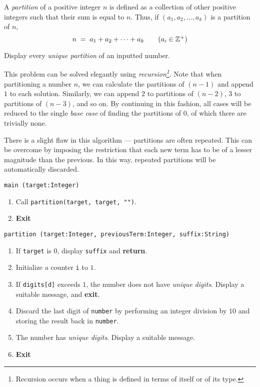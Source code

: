 

\problem A {\em partition} of a positive integer $n$ is defined as a collection of other positive integers such that
their sum is equal to $n$. Thus, if $(a_1, a_2, \dots, a_k)$ is a partition of $n$,
\begin{equation*}
	n	\;=\;	a_1 + a_2 + \dots + a_k 			\tag{$a_i \in \mathbb{Z}^{+}$}
\end{equation*}

Display every {\em unique partition} of an inputted number.

\solution This problem can be solved elegantly using {\em recursion\footnote{Recursion occurs when a thing is defined in terms of itself or of its type.}}. Note that when partitioning a number $n$, we can calculate the partitions of $(n - 1)$ and append $1$ to each solution. Similarly, we can append $2$ to partitions of $(n - 2)$, $3$ to partitions of $(n - 3)$, and so on. By continuing in this fashion, all cases will be reduced to the single {\em base case} of finding the partitions of $0$, of which there are trivially none.

There is a slight flaw in this algorithm --- partitions are often repeated. This can be overcome by imposing the restriction that each new term has to be of a lesser magnitude than the previous. In this way, repeated partitions will be automatically discarded.

\algorithm
{\tt main (target:Integer)}
\begin{enumerate}
	\item	Call {\tt partition(target, target, "")}.
	\item	{\bf Exit}
\end{enumerate}
{\tt partition (target:Integer, previousTerm:Integer, suffix:String)}
\begin{enumerate}
	\item	If {\tt target} is $0$, display {\tt suffix} and {\bf return}.
	\item	Initialize a counter {\tt i} to $1$.
	\item	If {\tt digits[d]} exceeds $1$, the number does not have {\em unique digits}. Display a suitable
			message, and {\bf exit}.
	\item	Discard the last digit of {\tt number} by performing an integer division by $10$ and storing
			the result back in {\tt number}.
	\item	The number has {\em unique digits}. Display a suitable message.
	\item	{\bf Exit}
\end{enumerate}

\sourcecode
